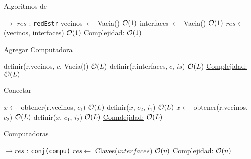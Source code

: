 \begin{Algoritmos}


\begin{algorithm}
  \caption{Algoritmos de }
\begin{algorithmic}[1]
   $\to$ $res$ : \texttt{redEstr}
  \State vecinos $\gets$ Vacia() \Comment $\mathcal{O}(1)$
  \State interfaces $\gets$ Vacia() \Comment $\mathcal{O}(1)$
  \State $res \gets$ (vecinos, interfaces) \Comment $\mathcal{O}(1)$
  \EndProcedure
  \underline{Complejidad:} $\mathcal{O}(1)$
\end{algorithmic}
\end{algorithm}


\begin{algorithm}
\caption{Agregar Computadora}
\begin{algorithmic}[1]
  \State definir(r.vecinos, $c$, Vacia()) \Comment $\mathcal{O}(L)$
  \State definir(r.interfaces, $c$, $is$) \Comment $\mathcal{O}(L)$
 \EndProcedure
 \underline{Complejidad:} $\mathcal{O}(L)$
\end{algorithmic}
\end{algorithm}


\begin{algorithm}
\caption{Conectar}
\begin{algorithmic}[1]
  \State $x \gets$ obtener(r.vecinos, $c_1$) \Comment $\mathcal{O}(L)$
  \State definir($x$, $c_2$, $i_1$) \Comment $\mathcal{O}(L)$
  \State $x \gets$ obtener(r.vecinos, $c_2$) \Comment $\mathcal{O}(L)$
  \State definir($x$, $c_1$, $i_2$) \Comment $\mathcal{O}(L)$
 \EndProcedure
 \underline{Complejidad:} $\mathcal{O}(L)$
\end{algorithmic}
\end{algorithm}



\begin{algorithm}
\caption{Computadoras}
\begin{algorithmic}[1]
   $\to res$ : \texttt{conj(compu)} 
  \State $res \gets$ Claves($interfaces$) \Comment $\mathcal{O}(n)$
 \EndProcedure
\underline{Complejidad:} $\mathcal{O}(n)$
\end{algorithmic}
\end{algorithm}



\end{Algoritmos}
